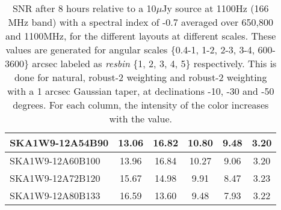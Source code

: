 \begin{table}[H]
{{\begin{tabular}{|lccccc|}
SKA1W9-12A54B90 & 13.06 \cellcolor{blue!18.00} & 16.82 \cellcolor{red!59.87} & 10.80 \cellcolor{green!60.00} & 9.48 \cellcolor{orange!60.00} & 3.20 \cellcolor{purple!18.00}\\ \hline 
SKA1W9-12A60B100 & 13.96 \cellcolor{blue!28.71} & 16.84 \cellcolor{red!60.00} & 10.27 \cellcolor{green!47.56} & 9.06 \cellcolor{orange!48.62} & 3.20 \cellcolor{purple!18.00}\\ \hline 
SKA1W9-12A72B120 & 15.67 \cellcolor{blue!49.05} & 14.98 \cellcolor{red!47.54} & 9.91 \cellcolor{green!39.12} & 8.47 \cellcolor{orange!32.63} & 3.23 \cellcolor{purple!26.40}\\ \hline 
SKA1W9-12A80B133 & 16.59 \cellcolor{blue!60.00} & 13.60 \cellcolor{red!38.30} & 9.48 \cellcolor{green!29.03} & 7.93 \cellcolor{orange!18.00} & 3.22 \cellcolor{purple!23.60}\\ \hline 
\end{tabular}}
\vspace{0.000000cm}
\hspace{1cm} 
\vspace{0.000000cm}
\hspace{1cm} 

\vspace{.25cm}
\caption{SNR after 8 hours relative to a 10$\mu$Jy source at 1100Hz (166 MHz band) with a spectral index of -0.7 averaged over 650,800 and 1100MHz, for the different layouts at different scales. These values are generated for angular scales \{0.4-1, 1-2, 2-3, 3-4, 600-3600\} arcsec labeled as {\it resbin} \{1, 2, 3, 4, 5\} respectively. This is done for natural, robust-2 weighting and robust-2 weighting with a 1 arcsec Gaussian taper, at declinations -10, -30 and -50 degrees. For each column, the intensity of the color increases with the value.}\label{tab:snravg}}
 \end{table}
